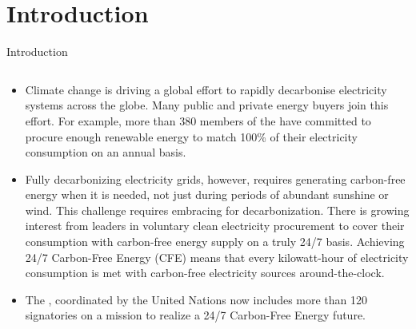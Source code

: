 
\section{Introduction}


\begin{frame}{Introduction}

  {\footnotesize
  \centering
  \begin{columns}[T]
  \begin{column}{9cm}
    \begin{itemize}
    \item Climate change is driving a global effort to \alert{rapidly decarbonise} 
    electricity systems across the globe. Many public and private energy buyers join this effort. For example, more than 380 members of the  have committed to procure enough renewable energy to match 100\% of their electricity consumption on an annual basis.

    \item Fully decarbonizing electricity grids, however, requires generating carbon-free energy when it is needed, not just during periods of abundant sunshine or wind. This challenge requires embracing  for decarbonization. 
    There is growing interest from leaders in voluntary clean electricity procurement to cover their consumption with carbon-free energy supply on a \alert{truly 24/7 basis}. Achieving 24/7 Carbon-Free Energy (CFE) means that every kilowatt-hour of electricity consumption is met
    with carbon-free electricity sources around-the-clock.

    \item The , coordinated by the United Nations now includes more than 120 signatories on a mission to realize a 24/7 Carbon-Free Energy future. 

    \end{itemize}
    \end{column}


\end{columns}}
\end{frame}
